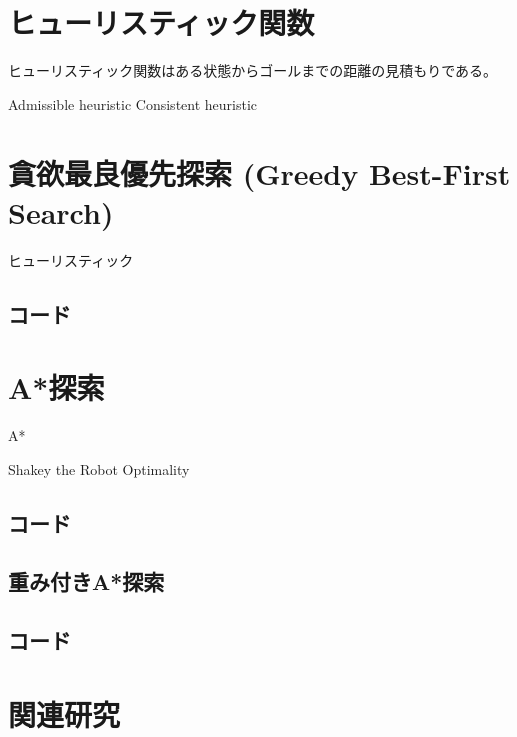 \documentclass{book}
\begin{document}
\section{ヒューリスティック関数}
ヒューリスティック関数はある状態からゴールまでの距離の見積もりである。

Admissible heuristic
Consistent heuristic

\section{貪欲最良優先探索 (Greedy Best-First Search)}
ヒューリスティック

\subsection{コード}

\section{A*探索}
A*

Shakey the Robot
Optimality



\subsection{コード}


\subsection{重み付きA*探索}

\subsection{コード}

\section{関連研究}
\end{document}
